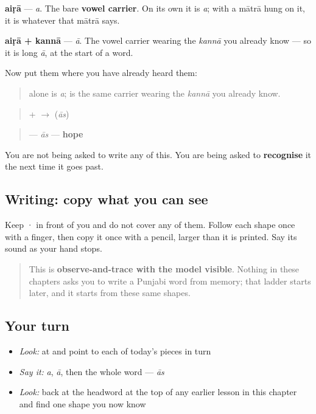 \textbf{aiṛā} — \emph{a}. The bare \textbf{vowel carrier}. On its own it is \emph{a}; with a mātrā hung on it, it is whatever that mātrā says.

\begin{quote}
\end{quote}

\textbf{aiṛā + kannā} — \emph{ā}. The vowel carrier wearing the \emph{kannā} you already know — so it is long \emph{ā}, at the start of a word.

Now put them where you have already heard them:

\begin{quote}
\textbf{} alone is \emph{a}; \textbf{} is the same carrier wearing the \emph{kannā} you already know.
\end{quote}

\begin{quote}
\textbf{} + \textbf{} $\to$ \textbf{} (\emph{ās})
\end{quote}

\begin{quote}
\textbf{} — \emph{ās} — \textbf{hope}
\end{quote}

You are not being asked to write any of this. You are being asked to \textbf{recognise} it the next time it goes past.

\subsection*{Writing: copy what you can see}
Keep  ·  in front of you and do not cover any of them. Follow each shape once with a finger, then copy it once with a pencil, larger than it is printed. Say its sound as your hand stops.

\begin{quote}
This is \textbf{observe-and-trace with the model visible}. Nothing in these chapters asks you to write a Punjabi word from memory; that ladder starts later, and it starts from these same shapes.
\end{quote}

\subsection*{Your turn}
\begin{itemize}
\raggedright
  \item \emph{Look:} at \textbf{} and point to each of today's pieces in turn
  \item \emph{Say it:} \emph{a}, \emph{ā}, then the whole word — \emph{ās}
  \item \emph{Look:} back at the headword at the top of any earlier lesson in this chapter and find one shape you now know
\end{itemize}

